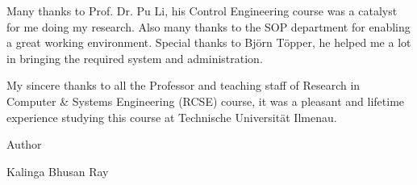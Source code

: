 \vspace{1em}
\noindent Many thanks to Prof. Dr. Pu Li, his Control Engineering course was a 
catalyst for me doing my research. Also many thanks to the SOP department for 
enabling a great working environment. Special thanks to Bj{\"o}rn T{\"o}pper, 
he helped me a lot in bringing the required system and administration.

\vspace{1em}
\noindent My sincere thanks to all the Professor and teaching staff of Research 
in Computer \& Systems Engineering (RCSE) course, it was a pleasant and lifetime experience studying this course at Technische Universit{\"a}t Ilmenau.

\vspace{1em}
\noindent Author

\vspace{1em}
\noindent Kalinga Bhusan Ray

